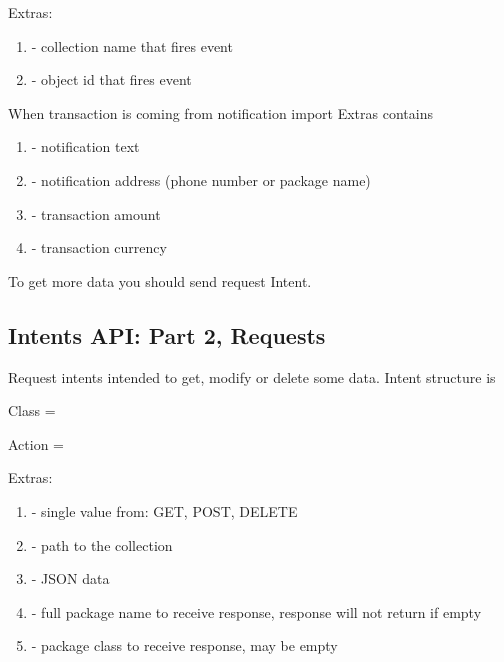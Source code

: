 \documentclass[a4paper,10pt,english]{sphinxmanual}
\begin{document}
Extras:
\begin{enumerate}
\def\theenumi{\arabic{enumi}}
\def\labelenumi{\theenumi .}
\makeatletter\def\p@enumii{\p@enumi \theenumi .}\makeatother
\item {} 
 - collection name that fires event

\item {} 
 - object id that fires event

\end{enumerate}

When transaction is coming from notification import Extras contains
\begin{enumerate}
\def\theenumi{\arabic{enumi}}
\def\labelenumi{\theenumi .}
\makeatletter\def\p@enumii{\p@enumi \theenumi .}\makeatother
\item {} 
 - notification text

\item {} 
 - notification address (phone number or package name)

\item {} 
 - transaction amount

\item {} 
 - transaction currency

\end{enumerate}

To get more data you should send request Intent.


\subsection{Intents API: Part 2, Requests}
\label{\detokenize{api:intents-api-part-2-requests}}
Request intents intended to get, modify or delete some data. Intent structure is

Class = 

Action = 

Extras:
\begin{enumerate}
\def\theenumi{\arabic{enumi}}
\def\labelenumi{\theenumi .}
\makeatletter\def\p@enumii{\p@enumi \theenumi .}\makeatother
\item {} 
 - single value from: GET, POST, DELETE

\item {} 
 - path to the collection

\item {} 
 - JSON data

\item {} 
 - full package name to receive response, response will not return if empty

\item {} 
 - package class to receive response, may be empty

\end{enumerate}
\end{document}
